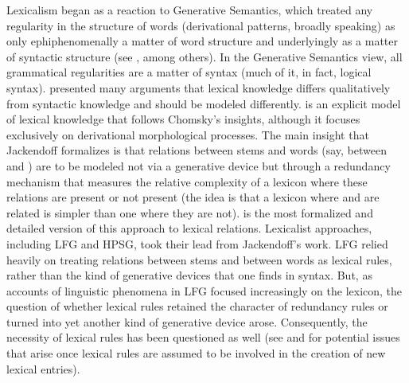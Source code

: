 \documentclass[output=paper]{langsci/langscibook}
\begin{document}
Lexicalism began as a reaction to Generative Semantics, which treated any regularity in the structure of words (derivational patterns, broadly speaking) as only ephiphenomenally a matter of word structure and underlyingly as a matter of syntactic structure (see \citet{Lakoff1970}, among others). In the Generative Semantics view, all grammatical regularities are a matter of syntax (much of it, in fact, logical syntax). \citet{Chomsky1970} presented many arguments that lexical knowledge differs qualitatively from syntactic knowledge and should be modeled differently. \citet{Jackendoff75a} is an explicit model of lexical knowledge that follows Chomsky's insights, although it focuses exclusively on derivational morphological processes. The main insight that Jackendoff formalizes is that relations between stems and words (say, between  and ) are to be modeled not via a generative device but through a redundancy mechanism that measures the relative complexity of a lexicon where these relations are present or not present (the idea is that a lexicon where  and  are related is simpler than one where they are not). \citet{Bochner1993} is the most formalized and detailed version of this approach to lexical relations. Lexicalist approaches, including LFG and HPSG, took their lead from Jackendoff's work.  LFG relied heavily on treating relations between stems and between words as lexical rules, rather than the kind of generative devices that one finds in syntax. But, as accounts of linguistic phenomena in LFG focused increasingly on the lexicon, the question of whether lexical rules retained the character of redundancy rules or turned into yet another kind of generative device arose.  Consequently, the necessity of lexical rules has been questioned as well (see \citet{KoenigandJurafsky1994} and \citet{Koenig99a} for potential issues that arise once lexical rules are assumed to be involved in the creation of new lexical entries). 
\end{document}

